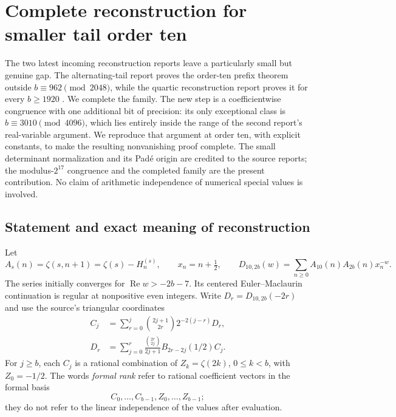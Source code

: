\documentclass[11pt]{article}
\theoremstyle{definition}
\theoremstyle{remark}
\numberwithin{equation}{section}
\begin{document}

\section{Complete reconstruction for smaller tail order ten}
\label{ten:section}

The two latest incoming reconstruction reports leave a particularly
small but genuine gap.  The alternating-tail report proves the order-ten
prefix theorem outside $b\equiv962\pmod{2048}$, while the quartic
reconstruction report proves it for every $b\ge1920$
\cite{AlternatingIncoming,QuarticIncoming}.  We complete the family.  The new step is
a coefficientwise congruence with one additional bit of precision:
its only exceptional class is $b\equiv3010\pmod{4096}$, which lies
entirely inside the range of the second report's real-variable argument.
We reproduce that argument at order ten, with explicit constants, to
make the resulting nonvanishing proof complete.  The small determinant
normalization and its Pad\'e origin are credited to the source reports;
the modulus-$2^{17}$ congruence and the completed family are the present
contribution.  No claim of arithmetic independence of numerical special
values is involved.

\subsection{Statement and exact meaning of reconstruction}

Let
\[
 A_s(n)=\zeta(s,n+1)=\zeta(s)-H_n^{(s)},\qquad x_n=n+\tfrac12,
 \qquad
 D_{10,2b}(w)=\sum_{n\ge0}A_{10}(n)A_{2b}(n)x_n^{-w}.
\]
The series initially converges for $\operatorname{Re}w>-2b-7$.
Its centered Euler--Maclaurin continuation is regular at nonpositive
even integers.  Write $D_r=D_{10,2b}(-2r)$ and use the source's
triangular coordinates
\begin{align}
 C_j&=\sum_{r=0}^{j}\binom{2j+1}{2r}2^{-2(j-r)}D_r,
 \label{ten:C}\\
 D_r&=\sum_{j=0}^{r}\frac{\binom{2r}{2j}}{2j+1}
             B_{2r-2j}(1/2)C_j.
 \label{ten:D}
\end{align}
For $j\ge b$, each $C_j$ is a rational combination of
$Z_k=\zeta(2k)$, $0\le k<b$, with $Z_0=-1/2$.  The words
\emph{formal rank} refer to rational coefficient vectors in the
formal basis
\[
 C_0,\ldots,C_{b-1},Z_0,\ldots,Z_{b-1};
\]
they do not refer to the linear independence of the values after
evaluation.
\end{document}
